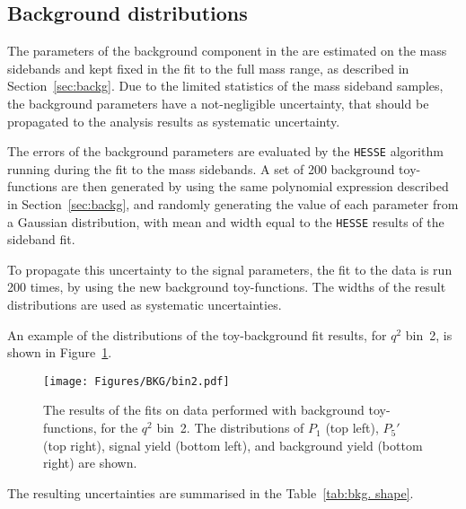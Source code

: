 \subsection{Background distributions}
\label{sec:sys-bkg}

The parameters of the background component in the \pdf are estimated on the mass sidebands and kept fixed in the fit to the full mass range, as described in Section~\ref{sec:backg}.
Due to the limited statistics of the mass sideband samples, the background parameters have a not-negligible uncertainty, that should be propagated to the analysis results as systematic uncertainty.

The errors of the background \pdf parameters are evaluated by the {\tt HESSE} algorithm running during the fit to the mass sidebands.
A set of 200 background toy-functions are then generated by using the same polynomial expression described in Section~\ref{sec:backg}, and randomly generating the value of each parameter from a Gaussian distribution, with mean and width equal to the {\tt HESSE} results of the sideband fit.

To propagate this uncertainty to the signal parameters, the fit to the data is run 200 times, by using the new background toy-functions. The widths of the result distributions are used as systematic uncertainties.

An example of the distributions of the toy-background fit results, for $q^2$ bin~2, is shown in Figure~\ref{fig:BKG-bin2}.

\begin{figure}[!hbt]
  \centering
  \texttt{[image: Figures/BKG/bin2.pdf]}
  \caption{The results of the fits on data performed with background toy-functions, for the $q^2$ bin~2.
    The distributions of $P_1$ (top left), $P_5'$ (top right), signal yield (bottom left), and background yield (bottom right) are shown.}
  \label{fig:BKG-bin2}
\end{figure}

The resulting uncertainties are summarised in the Table~\ref{tab:bkg. shape}.


